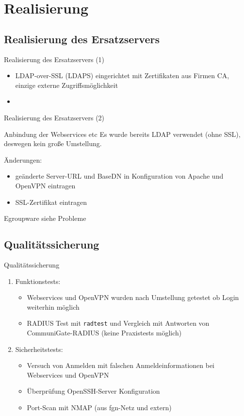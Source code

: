 \documentclass[handout,svgnames]{beamer}
\begin{document}
\section{Realisierung}
\subsection{Realisierung des Ersatzservers}
\begin{frame}{Realisierung des Ersatzservers (1)}
\begin{itemize}
	\item LDAP-over-SSL (LDAPS) eingerichtet mit Zertifikaten aus Firmen CA, einzige externe Zugriffsmöglichkeit
	\item 
\end{itemize}
\end{frame}


\begin{frame}{Realisierung des Ersatzservers (2)}

\end{frame}


\begin{frame}{Anbindung der Webservices etc}
Es wurde bereits LDAP verwendet (ohne SSL), deswegen kein große Umstellung.

Änderungen:
\begin{itemize}
	\item geänderte Server-URL und BaseDN in Konfiguration von Apache und OpenVPN eintragen
	\item SSL-Zertifikat eintragen
\end{itemize}
Egroupware siehe Probleme
\end{frame}


\subsection{Qualitätssicherung}
\begin{frame}{Qualitätssicherung}
\begin{enumerate}
	\item Funktionstests:
	\begin{itemize}
		\item Webservices und OpenVPN wurden nach Umstellung getestet ob Login weiterhin möglich
		\item RADIUS Test mit \texttt{radtest} und Vergleich mit Antworten von CommuniGate-RADIUS (keine Praxistests möglich)
	\end{itemize}
	\item Sicherheitstests:
	\begin{itemize}
		\item Versuch von Anmelden mit falschen Anmeldeinformationen bei Webservices und OpenVPN
		\item Überprüfung OpenSSH-Server Konfiguration
		\item Port-Scan mit NMAP (aus fgn-Netz und extern)
	\end{itemize}
\end{enumerate}
\end{frame}
\end{document}
